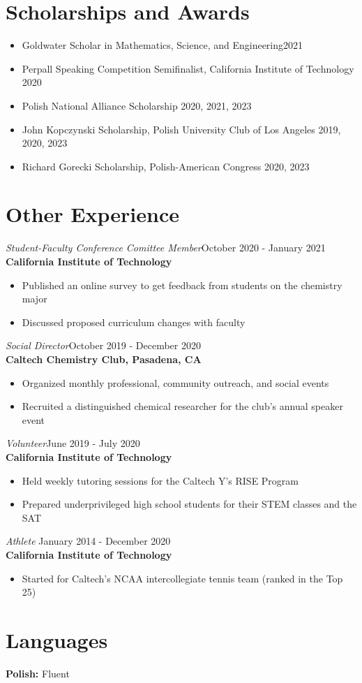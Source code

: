 \documentclass[margin,line]{resume}
\begin{document}
\begin{resume}
\section{\mysidestyle Scholarships and Awards}
\begin{itemize}
    \item  \textnormal{Goldwater Scholar in Mathematics, Science, and Engineering}\hfill 2021
    \item \textnormal{Perpall Speaking Competition} Semifinalist, California Institute of Technology \hfill 2020
    \item \textnormal{Polish National Alliance Scholarship} \hfill 2020, 2021, 2023
    \item \textnormal{John Kopczynski Scholarship}, Polish University Club of Los Angeles \hfill 2019, 2020, 2023
    \item \textnormal{Richard Gorecki Scholarship}, Polish-American Congress \hfill 2020, 2023
\end{itemize}

\section{\mysidestyle Other Experience}
{\sl Student-Faculty Conference Comittee Member}\hfill October 2020 - January 2021\\
\textbf{California Institute of Technology}
\begin{itemize}
\item Published an online survey to get feedback from students on the chemistry major
\item Discussed proposed curriculum changes with faculty
\end{itemize}
{\sl Social Director}\hfill October 2019 - December 2020\\
\textbf{Caltech Chemistry Club, Pasadena, CA}
\begin{itemize}
\item Organized monthly professional, community outreach, and social events
\item Recruited a distinguished chemical researcher for the club's annual speaker event
\end{itemize}
\newpage
{\sl Volunteer}\hfill June 2019 - July 2020\\
\textbf{California Institute of Technology}
\begin{itemize}
\item Held weekly tutoring sessions for the Caltech Y's RISE Program
\item Prepared underprivileged high school students for their STEM classes and the SAT
\end{itemize}
{\sl Athlete} \hfill January 2014 - December 2020\\
\textbf{California Institute of Technology}
\begin{itemize}
\item Started for Caltech's NCAA intercollegiate tennis team (ranked in the Top 25)
\end{itemize}

\section{\mysidestyle Languages}
\textbf{Polish: }\textnormal{Fluent}




\end{resume}   
\end{document}
